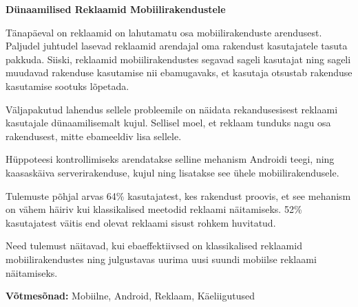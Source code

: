 \begin{abstracts}

\textbf{Dünaamilised Reklaamid Mobiilirakendustele}

T\"{a}nap\"{a}eval on reklaamid on lahutamatu osa mobiilirakenduste arendusest. Paljudel juhtudel lasevad reklaamid arendajal oma rakendust kasutajatele tasuta pakkuda. Siiski, reklaamid mobiilirakendustes segavad sageli kasutajat ning sageli muudavad rakenduse kasutamise nii ebamugavaks, et kasutaja otsustab rakenduse kasutamise sootuks l\~{o}petada.

V\"{a}ljapakutud lahendus sellele probleemile on n\"{a}idata rekandusesisest reklaami kasutajale d\"{u}naamilisemalt kujul. Sellisel moel, et reklaam tunduks nagu osa rakendusest, mitte ebameeldiv lisa sellele.

H\"{u}ppoteesi kontrollimiseks arendatakse selline mehanism Androidi teegi, ning kaasask\"{a}iva serverirakenduse, kujul ning lisatakse see \"{u}hele mobiilirakendusele.

Tulemuste p\~{o}hjal arvas 64\% kasutajatest, kes rakendust proovis, et see mehanism on v\"{a}hem h\"{a}iriv kui klassikalised meetodid reklaami n\"{a}itamiseks. 52\% kasutajatest v\"{a}itis end olevat reklaami sisust rohkem huvitatud.

Need tulemust n\"{a}itavad, kui ebaeffektiivsed on klassikalised reklaamid mobiilirakendustes ning julgustavas uurima uusi suundi mobiilse reklaami n\"{a}itamiseks.

\bigskip

\textbf{V\~{o}tmes\~{o}nad:} Mobiilne, Android, Reklaam, K\"{a}eliigutused

\end{abstracts}
